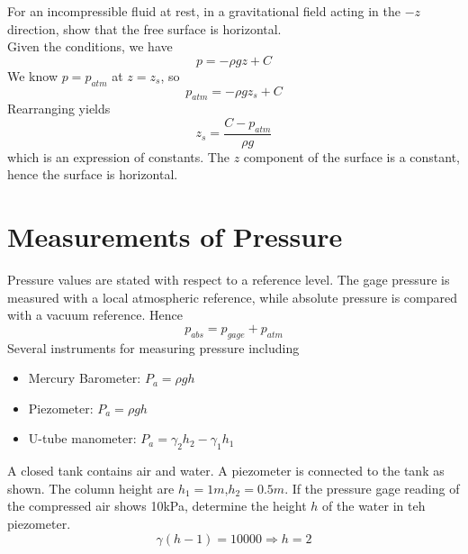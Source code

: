 \documentclass[12pt]{article}
\begin{document}
\begin{ex}
	For an incompressible fluid at rest, in a gravitational field acting in the $-z$ direction, show that the free surface is horizontal. \\
	Given the conditions, we have
	$$p = -\rho gz + C$$
	We know $p = p_{atm}$ at $z = z_s$, so
	$$p_{atm} = -\rho gz_s+C$$
	Rearranging yields
	$$z_s = \frac{C-p_{atm}}{\rho g}$$
	which is an expression of constants. The $z$ component of the surface is a constant, hence the surface is horizontal.
\end{ex}

\section{Measurements of Pressure}
Pressure values are stated with respect to a reference level. The gage pressure is measured with a local atmospheric reference, while absolute pressure is compared with a vacuum reference. Hence
$$p_{abs} = p_{gage} + p_{atm}$$
Several instruments for measuring pressure including
\begin{itemize}
	\item Mercury Barometer: $P_a = \rho gh$
	\item Piezometer: $P_a = \rho gh$
	\item U-tube manometer: $P_a = \gamma_2h_2 - \gamma_1h_1$
\end{itemize}

\begin{ex}
	A closed tank contains air and water. A piezometer is connected to the tank as shown. The column height are $h_1=1m$,$h_2=0.5m$. If the pressure gage reading of the compressed air shows 10kPa, determine the height $h$ of the water in teh piezometer. \\
	$$\gamma(h-1) = 10000 \Rightarrow h = 2$$
\end{ex}
\end{document}
